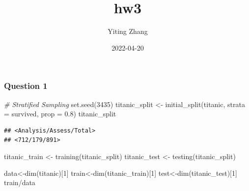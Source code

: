 \documentclass[
]{article}
\title{hw3}
\author{Yiting Zhang}
\date{2022-04-20}
\newenvironment{Shaded}{\begin{snugshade}}{\end{snugshade}}
\newcommand{\AttributeTok}[1]{\textcolor[rgb]{0.77,0.63,0.00}{#1}}
\newcommand{\CommentTok}[1]{\textcolor[rgb]{0.56,0.35,0.01}{\textit{#1}}}
\newcommand{\DecValTok}[1]{\textcolor[rgb]{0.00,0.00,0.81}{#1}}
\newcommand{\FloatTok}[1]{\textcolor[rgb]{0.00,0.00,0.81}{#1}}
\newcommand{\FunctionTok}[1]{\textcolor[rgb]{0.00,0.00,0.00}{#1}}
\newcommand{\NormalTok}[1]{#1}
\newcommand{\OtherTok}[1]{\textcolor[rgb]{0.56,0.35,0.01}{#1}}
\newcommand{\SpecialCharTok}[1]{\textcolor[rgb]{0.00,0.00,0.00}{#1}}
\newcommand{\StringTok}[1]{\textcolor[rgb]{0.31,0.60,0.02}{#1}}
\begin{document}
\maketitle

\begin{Shaded}
\end{Shaded}

\hypertarget{question-1}{%
\subsubsection{Question 1}\label{question-1}}

\begin{Shaded}
\begin{Highlighting}[]
\CommentTok{\# Stratified Sampling}
\FunctionTok{set.seed}\NormalTok{(}\DecValTok{3435}\NormalTok{)}
\NormalTok{titanic\_split }\OtherTok{\textless{}{-}} \FunctionTok{initial\_split}\NormalTok{(titanic, }\AttributeTok{strata =}\NormalTok{ survived, }\AttributeTok{prop =} \FloatTok{0.8}\NormalTok{)}
\NormalTok{titanic\_split}
\end{Highlighting}
\end{Shaded}

\begin{verbatim}
## <Analysis/Assess/Total>
## <712/179/891>
\end{verbatim}

\begin{Shaded}
\begin{Highlighting}[]
\NormalTok{titanic\_train }\OtherTok{\textless{}{-}} \FunctionTok{training}\NormalTok{(titanic\_split)}
\NormalTok{titanic\_test }\OtherTok{\textless{}{-}} \FunctionTok{testing}\NormalTok{(titanic\_split)}

\NormalTok{data}\OtherTok{\textless{}{-}}\FunctionTok{dim}\NormalTok{(titanic)[}\DecValTok{1}\NormalTok{]}
\NormalTok{train}\OtherTok{\textless{}{-}}\FunctionTok{dim}\NormalTok{(titanic\_train)[}\DecValTok{1}\NormalTok{]}
\NormalTok{test}\OtherTok{\textless{}{-}}\FunctionTok{dim}\NormalTok{(titanic\_test)[}\DecValTok{1}\NormalTok{]}
\NormalTok{train}\SpecialCharTok{/}\NormalTok{data}
\end{Highlighting}
\end{Shaded}
\end{document}

